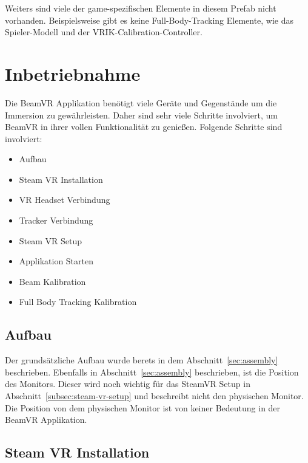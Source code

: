 
Weiters sind viele der game-spezifischen Elemente in diesem Prefab nicht vorhanden.
Beispielsweise gibt es keine Full-Body-Tracking Elemente, wie das Spieler-Modell und der VRIK-Calibration-Controller.

\section{Inbetriebnahme}
\label{sec:commissioning}

Die BeamVR Applikation benötigt viele Geräte und Gegenstände um die Immersion zu gewährleisten.
Daher sind sehr viele Schritte involviert, um BeamVR in ihrer vollen Funktionalität zu genießen.
Folgende Schritte sind involviert:

\begin{itemize}
    \item Aufbau
    \item Steam VR Installation
    \item VR Headset Verbindung
    \item Tracker Verbindung
    \item Steam VR Setup
    \item Applikation Starten
    \item Beam Kalibration
    \item Full Body Tracking Kalibration
\end{itemize}


\subsection{Aufbau}

Der grundsätzliche Aufbau wurde berets in dem Abschnitt~\ref{sec:assembly} beschrieben.
Ebenfalls in Abschnitt~\ref{sec:assembly} beschrieben, ist die Position des Monitors.
Dieser wird noch wichtig für das SteamVR Setup in Abschnitt~\ref{subsec:steam-vr-setup} und beschreibt nicht den physischen Monitor.
Die Position von dem physischen Monitor ist von keiner Bedeutung in der BeamVR Applikation.

\subsection{Steam VR Installation}

